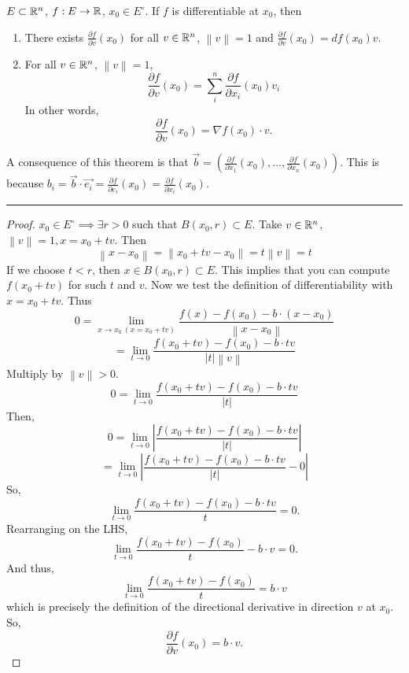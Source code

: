 \documentclass[11pt]{article}
\newcommand{\norm}[1]{\left\lVert #1 \right\rVert}
\newcommand{\ra}{\rightarrow}
\begin{document}
\begin{theorem}
    $E \subset \mathbb{R}^n$, $f: E \ra \R$, $x_0 \in E^\circ$. If $f$ is differentiable at $x_0$, then 
    \begin{enumerate}[label = \roman*)]
        \item There exists $\frac{\partial f}{\partial v}(x_0)$ for all $v \in \mathbb{R}^n$, $\norm{v} = 1$ and $\frac{\partial f}{\partial v}(x_0) = df(x_0)v$.
        \item For all $v \in \mathbb{R}^n$, $\norm{v} = 1$, 
        \[\frac{\partial f}{\partial v}(x_0) = \sum_{i}^{n}\frac{\partial f}{\partial x_i}(x_0)v_i\]
        In other words,
        \[\frac{\partial f}{\partial v}(x_0) = \nabla f(x_0)\cdot v. \]
    \end{enumerate}
        A consequence of this theorem is that $\vec{b} = (\frac{\partial f}{\partial x_1} (x_0), ..., \frac{\partial f }{\partial x_n} (x_0))$. This is because $b_i =\vec{b} \cdot \vec{e_i} = \frac{\partial f}{\partial e_i}(x_0) = \frac{\partial f}{\partial x_i}(x_0)$. \vspace{3mm}
        \hrule
        \begin{proof}
            $x_0 \in E^\circ \implies \exists r > 0$ such that $B(x_0,r) \subset E$. Take $v \in \mathbb{R}^n$, $\norm{v} = 1, x = x_0 + tv$. Then
            \[\norm{x - x_0} = \norm{x_0 + tv - x_0} = t\norm{v} = t\]
            If we choose $t < r$, then $x \in B(x_0,r) \subset E$. This implies that you can compute $f(x_0 + tv)$ for such $t$ and $v$. Now we test the definition of differentiability with $x = x_0 + tv$. Thus
            \[0 = \lim_{x \ra x_0 \ (x = x_0 + tv)} \frac{f(x) - f(x_0) - b \cdot (x - x_0)}{\norm{x - x_0}}\]
            \[ = \lim_{t \ra 0} \frac{f(x_0 + tv) - f(x_0) - b \cdot tv}{|t| \norm{v}}\]
            Multiply by $\norm{v} > 0$.
            \[0 = \lim_{t \ra 0} \frac{f(x_0 + tv) - f(x_0) - b \cdot tv}{|t|}\]
            Then,
            \[0 = \lim_{t \ra 0} \left| \frac{f(x_0 + tv) - f(x_0) - b \cdot tv}{|t|}\right|\]
            \[= \lim_{t \ra 0} \left| \frac{f(x_0 + tv) - f(x_0) - b \cdot tv}{|t|} - 0\right|\]
            So,
            \[\lim_{t \ra 0} \frac{f(x_0 + tv) - f(x_0) - b \cdot tv}{t} = 0.\]
            Rearranging on the LHS,
            \[\lim_{t \ra 0} \frac{f(x_0 + tv) - f(x_0)}{t} - b \cdot v = 0.\]
            And thus,
            \[\lim_{t \ra 0} \frac{f(x_0 + tv) - f(x_0)}{t} = b \cdot v\]
            which is precisely the definition of the directional derivative in direction $v$ at $x_0$. So, \[\frac{\partial f}{\partial v}(x_0) = b \cdot v.\]
        \end{proof}
    \end{theorem}
        
\end{document}
